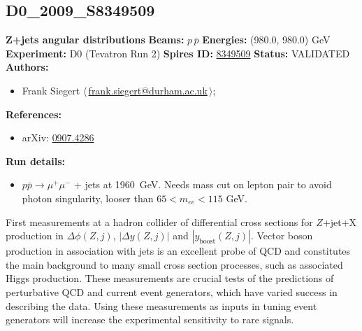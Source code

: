\subsection[D0\_2009\_S8349509]{D0\_2009\_S8349509\,\cite{Abazov:2009pp}}
\textbf{Z+jets angular distributions}\newline
\textbf{Beams:} $p$\,$\bar{p}$ \newline
\textbf{Energies:} (980.0, 980.0) GeV \newline
\textbf{Experiment:} D0 (Tevatron Run 2) \newline
\textbf{Spires ID:} \href{http://www.slac.stanford.edu/spires/find/hep/www?rawcmd=key+8349509}{8349509}\newline
\textbf{Status:} VALIDATED\newline
\textbf{Authors:}
\begin{itemize}
  \item Frank Siegert $\langle\,$\href{mailto:frank.siegert@durham.ac.uk}{frank.siegert@durham.ac.uk}$\,\rangle$;
\end{itemize}
\textbf{References:}
\begin{itemize}
  \item arXiv: \href{http://arxiv.org/abs/0907.4286}{0907.4286}
\end{itemize}
\textbf{Run details:}
\begin{itemize}

  \item $p \bar{p} \to \mu^+ \mu^-$ + jets at 1960~GeV. Needs mass cut on lepton pair to avoid photon singularity, looser than $65 < m_{ee} < 115$ GeV.\end{itemize}

\noindent First measurements at a hadron collider of differential cross sections for $Z$+jet+X production in $\Delta\phi(Z, j)$, $|\Delta y(Z, j)|$ and $|y_\mathrm{boost}(Z, j)|$. Vector boson production in association with jets is an excellent probe of QCD and constitutes the main background to many small cross section processes, such as associated Higgs production. These measurements are crucial tests of the predictions of perturbative QCD and current event generators, which have varied success in describing the data. Using these measurements as inputs in tuning event generators will increase the experimental sensitivity to rare signals.

\clearpage


\clearpage

